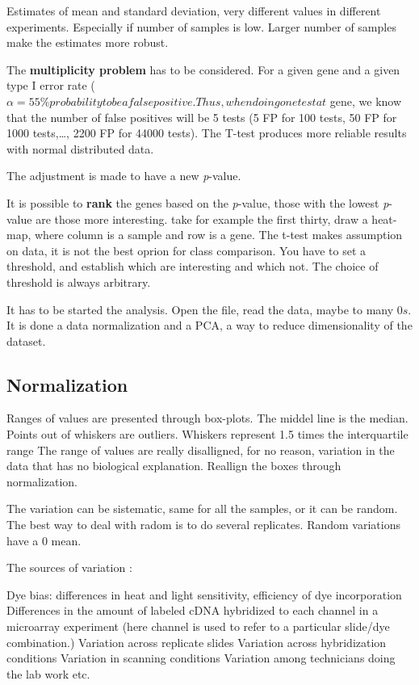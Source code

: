 Estimates of mean and standard deviation, very different values in different experiments. Especially if number of samples is low. Larger number of samples make the estimates more robust.

The \textbf{multiplicity problem} has to be considered.
For a given gene and a given type I error rate ($ \alpha=5%
5\% probability to be a false positive. Thus, when doing one test at $ %
gene, we know that the number of false positives will be 5%
tests (5 FP for 100 tests, 50 FP for 1000 tests,…, 2200 FP for 44000 tests).
The T-test produces more reliable results with normal distributed data.


The adjustment is made to have a new \textit{p}-value.

It is possible to \textbf{rank} the genes based on the \textit{p}-value, those with the lowest \textit{p}-value are those more interesting. take for example the first thirty, draw a heat-map, where column is a sample and row is a gene. The t-test makes assumption on data, it is not the best oprion for class comparison. You have to set a threshold, and establish which are interesting and which not. The choice of threshold is always arbitrary. 

It has to be started the analysis. Open the file, read the data, maybe to many $ 0s $. It is done a data normalization and a PCA, a way to reduce dimensionality of the dataset. 

\subsection{Normalization}
Ranges of values are presented through box-plots. The middel line is the median. Points out of whiskers are outliers. Whiskers represent 1.5 times the interquartile range %
The range of values are really disalligned, for no reason, variation in the data that has no biological explanation. Reallign the boxes through normalization.

The variation can be sistematic, same for all the samples, or it can be random. The best way to deal with radom is to do several replicates. Random variations have a 0 mean. 

The sources of variation :

Dye bias: differences in heat and light sensitivity, efficiency of
dye incorporation
Differences in the amount of labeled cDNA hybridized to each
channel in a microarray experiment (here channel is used to
refer to a particular slide/dye combination.)
Variation across replicate slides
Variation across hybridization conditions
Variation in scanning conditions
Variation among technicians doing the lab work
etc.

